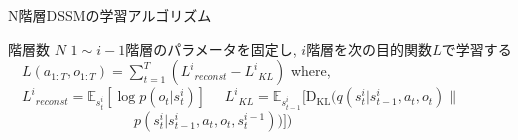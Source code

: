 \documentclass[10pt, twocolumn]{jarticle}
\begin{document}
\begin{algorithm}[h]               
  \caption{\small N階層DSSMの学習アルゴリズム}
  \label{alg1}
  \begin{algorithmic}
    \REQUIRE \small 階層数 $N$ 
        \STATE \small $1 \sim i-1$階層のパラメータを固定し, 
        \STATE \small $i$階層を次の目的関数$L$で学習する
        \STATE $\hspace{1em} L(a_{1:T}, o_{1:T}) = \sum_{t=1}^T ( {L^i}_{reconst} - {L^i}_{KL}) $
        \STATE where, 
        \STATE $\hspace{1em} {L^i}_{reconst} = \mathbb{E}_{s^i_t} [\log p(o_t|s^i_t)]$
        \STATE $\hspace{1em} {L^i}_{KL} = \mathbb{E}_{s^i_{t-1}} [\mathrm{D_{KL}}(q(s^i_t|s^i_{t-1}, a_t, o_t) \| $
        \STATE $\hspace{9em} p(s^i_t|s^i_{t-1}, a_t, o_t, s^{i-1}_t))] )$
      \ENDWHILE
    \ENDFOR
  \end{algorithmic}
\end{algorithm}



\end{document}
